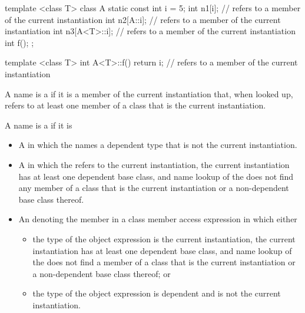 \begin{example}
\begin{codeblock}
template <class T> class A {
  static const int i = 5;
  int n1[i];                    //  refers to a member of the current instantiation
  int n2[A::i];                 //  refers to a member of the current instantiation
  int n3[A<T>::i];              //  refers to a member of the current instantiation
  int f();
};

template <class T> int A<T>::f() {
  return i;                     //  refers to a member of the current instantiation
}
\end{codeblock}
\end{example}

%
A name is a  if it is a
member of the current instantiation that, when looked up, refers to at least
one member of a class that is the current instantiation.

\pnum
A name is a
if it is

\begin{itemize}
\item
A
in which the
names a dependent type that is not the current instantiation.

\item A  in which the 
refers to the current instantiation, the current instantiation has at least one
dependent base class, and name lookup of the  does not
find any member of a class that is the current instantiation or a non-dependent
base class thereof.

\item An  denoting the member in a class member access
expression in which either
\begin{itemize}
\item the type of the object expression is the current instantiation, the
current instantiation has at least one dependent base class, and name lookup
of the  does not find a member of a class that is
the current instantiation or a non-dependent base class thereof; or

\item the type of the object expression is dependent and is not the current
instantiation.
\end{itemize}
\end{itemize}

